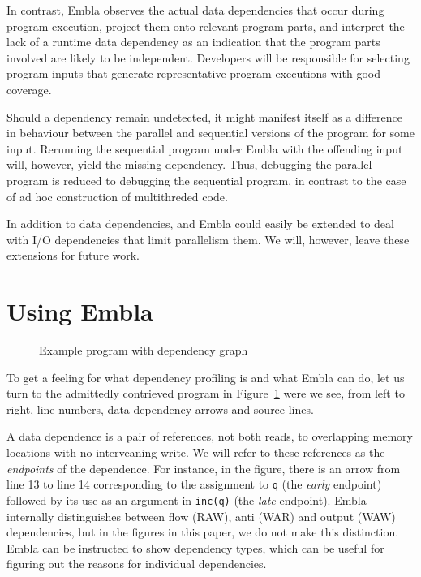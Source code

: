 \documentclass{acm_proc_article-sp}
\begin{document}
In contrast, Embla
observes the actual data dependencies that occur during program
execution, project them onto relevant program parts, and interpret the
lack of a runtime data dependency as an indication that the program
parts involved are likely to be independent.
Developers will be responsible for selecting
program inputs that generate representative program executions with
good coverage.

Should a dependency remain undetected, it might manifest itself as a 
difference in behaviour between the parallel and sequential versions of the
program for some input. Rerunning the sequential program under
Embla with the offending input will, however, yield the missing dependency.
Thus, debugging the parallel program is reduced to debugging the sequential 
program, in contrast to the case of ad hoc construction of multithreded
code.

In addition to data dependencies, and Embla could easily be extended to
deal with I/O dependencies that limit parallelism them. We will, however,
leave these extensions for future work.



\section{Using Embla}

\begin{figure} 
\small

\caption{Example program with dependency graph} \label{ffirstex}
\end{figure}

To get a feeling for what dependency profiling is and what Embla can do, 
let us turn to the admittedly contrieved program in Figure~\ref{ffirstex}
were we see, from left to right, line numbers, data dependency 
arrows and source lines. 

A data dependence is a pair
of references, not both reads, to overlapping memory
locations with no interveaning write. We will refer to these
references as the {\em endpoints} of the dependence.
For instance, in the figure, 
there is an arrow from line 13 to line 14 corresponding to
the assignment to {\tt q} (the {\em early} endpoint) followed by its use 
as an argument in {\tt inc(q)} (the {\em late} endpoint). Embla
internally distinguishes between flow (RAW), anti (WAR) and output (WAW) 
dependencies, but in the figures in this paper, we do not make this
distinction. Embla can be instructed to show dependency types, which can be
useful for figuring out the reasons for individual dependencies.
\end{document}
